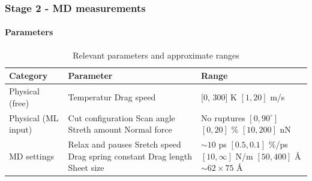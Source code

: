 \documentclass[
	10pt, %
]{beamer}
\begin{document}
\begin{frame}
	\frametitle{Stage 2 - MD measurements}
	\framesubtitle{Parameters} %
	
	\begin{table}
		\begin{tabular}{| l | p{35mm} | p{30mm} |}
			\toprule
			\textbf{Category} & \textbf{Parameter} & \textbf{Range} \\ \hline
			Physical (free) & 
			Temperatur 		 		\newline 
			Drag speed 				&
			[0, 300] K 				\newline 
			$[1, 20]$ m/s				\\ \hline

			Physical (ML input) &
			Cut configuration 		\newline
			Scan angle 				\newline
			Streth amount 			\newline
			Normal force 			&
			No ruptures 			\newline
			$[0, 90^{\circ}]$ 		\newline
			$[0, 20]$ \% 				\newline
			$[10, 200]$ nN 			\\ \hline

			MD settings &
			Relax and pauses \newline
			Sretch speed \newline
			Drag spring constant \newline
			Drag length \newline
			Sheet size &
			$\sim 10$ ps			\newline
			$[0.5, 0.1]$ \%/ps  	\newline
			$[10, \infty]$ N/m 		\newline
			$[50, 400]$ Å 			\newline
			$\sim 62 \times 75$ Å	\\ \hline
		\end{tabular}
		\caption{Relevant parameters and approximate ranges}
	\end{table}
	
	
\end{frame}



	
\end{document}
